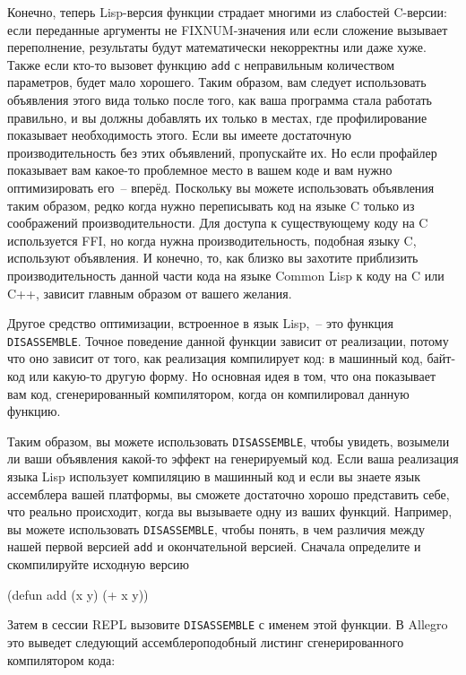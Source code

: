 Конечно, теперь Lisp-версия функции страдает многими из слабостей C-версии: если
переданные аргументы не FIXNUM-значения или если сложение вызывает переполнение,
результаты будут математически некорректны или даже хуже. Также если кто-то вызовет
функцию \lstinline{add} с неправильным количеством параметров, будет мало хорошего. Таким
образом, вам следует использовать объявления этого вида только после того, как ваша
программа стала работать правильно, и вы должны добавлять их только в местах, где
профилирование показывает необходимость этого. Если вы имеете достаточную
производительность без этих объявлений, пропускайте их. Но если профайлер показывает вам
какое-то проблемное место в вашем коде и вам нужно оптимизировать его~-- вперёд. Поскольку
вы можете использовать объявления таким образом, редко когда нужно переписывать код на
языке C только из соображений производительности. Для доступа к существующему коду на C
используется FFI, но когда нужна производительность, подобная языку C, используют
объявления. И конечно, то, как близко вы захотите приблизить производительность данной
части кода на языке Common Lisp к коду на C или C++, зависит главным образом от вашего
желания.

Другое средство оптимизации, встроенное в язык Lisp,~-- это функция
\lstinline{DISASSEMBLE}. Точное поведение данной функции зависит от реализации, потому что оно
зависит от того, как реализация компилирует код: в машинный код, байт-код или какую-то
другую форму. Но основная идея в том, что она показывает вам код, сгенерированный
компилятором, когда он компилировал данную функцию.

Таким образом, вы можете использовать \lstinline{DISASSEMBLE}, чтобы увидеть, возымели ли ваши
объявления какой-то эффект на генерируемый код. Если ваша реализация языка Lisp использует
компиляцию в машинный код и если вы знаете язык ассемблера вашей платформы, вы сможете
достаточно хорошо представить себе, что реально происходит, когда вы вызываете одну из
ваших функций. Например, вы можете использовать \lstinline{DISASSEMBLE}, чтобы понять, в чем
различия между нашей первой версией \lstinline{add} и окончательной версией. Сначала определите
и скомпилируйте исходную версию

\begin{myverb}
(defun add (x y) (+ x y))
\end{myverb}

Затем в сессии REPL вызовите \lstinline{DISASSEMBLE} с именем этой функции. В Allegro это
выведет следующий ассемблероподобный листинг сгенерированного компилятором кода:

